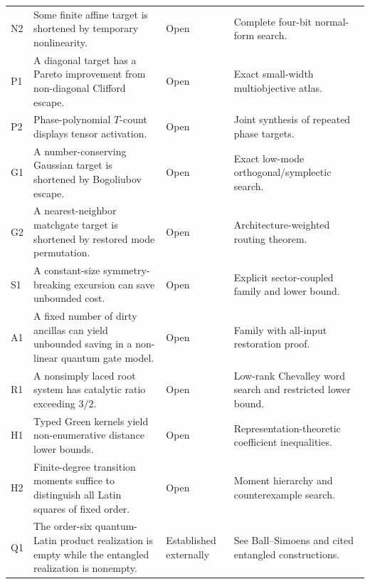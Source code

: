 \begin{longtable}{@{}>{\raggedright\arraybackslash}p{}>{\raggedright\arraybackslash}p{}>{\raggedright\arraybackslash}p{}>{\raggedright\arraybackslash}p{}@{}}
N2 & Some finite affine target is shortened by temporary nonlinearity. & Open & Complete four-bit normal-form search.\\
P1 & A diagonal target has a Pareto improvement from non-diagonal Clifford escape. & Open & Exact small-width multiobjective atlas.\\
P2 & Phase-polynomial $T$-count displays tensor activation. & Open & Joint synthesis of repeated phase targets.\\
G1 & A number-conserving Gaussian target is shortened by Bogoliubov escape. & Open & Exact low-mode orthogonal/symplectic search.\\
G2 & A nearest-neighbor matchgate target is shortened by restored mode permutation. & Open & Architecture-weighted routing theorem.\\
S1 & A constant-size symmetry-breaking excursion can save unbounded cost. & Open & Explicit sector-coupled family and lower bound.\\
A1 & A fixed number of dirty ancillas can yield unbounded saving in a non-linear quantum gate model. & Open & Family with all-input restoration proof.\\
R1 & A nonsimply laced root system has catalytic ratio exceeding $3/2$. & Open & Low-rank Chevalley word search and restricted lower bound.\\
H1 & Typed Green kernels yield non-enumerative distance lower bounds. & Open & Representation-theoretic coefficient inequalities.\\
H2 & Finite-degree transition moments suffice to distinguish all Latin squares of fixed order. & Open & Moment hierarchy and counterexample search.\\
Q1 & The order-six quantum-Latin product realization is empty while the entangled realization is nonempty. & Established externally & See Ball--Simoens and cited entangled constructions.\\
\bottomrule
\end{longtable}

